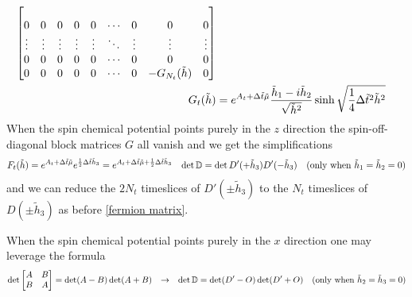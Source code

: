 \begin{align}
\begin{bmatrix}
\\	0               & 0         & 0                 & 0         & 0      & \cdots & 0       & 0                    & 0
\\	\vdots          & \vdots    & \vdots            & \vdots    & \vdots & \ddots & \vdots  & \vdots               & \vdots
\\	0               & 0         & 0                 & 0         & 0      & \cdots & 0       & 0                    & 0
\\	0               & 0         & 0                 & 0         & 0      & \cdots & 0       & -G_{N_t}(\tilde{h})  & 0
	\end{bmatrix}
    \\
	G_t(\tilde{h}) &= e^{A_t + \Delta\tilde{t}\tilde{\mu}} \frac{\tilde{h}_1 - i\tilde{h}_2}{\sqrt{\tilde{h}^2}} \sinh\sqrt{\frac{1}{4}\Delta\tilde{t}^2 \tilde{h}^2}
\end{align}
When the spin chemical potential points purely in the $z$ direction the spin-off-diagonal block matrices $G$ all vanish and we get the simplifications
\begin{align}
	F_t(\tilde{h}) &= e^{A_t + \Delta\tilde{t}\tilde{\mu}} e^{\frac{1}{2} \Delta\tilde{t} \tilde{h}_3} = e^{A_t + \Delta\tilde{t}\tilde{\mu} + \frac{1}{2} \Delta\tilde{t} \tilde{h}_3}
	&
	\det \mathbb{D} &= \det D'(+\tilde{h}_3) D'(-\tilde{h}_3)
	&
	(\text{only when }\tilde{h}_1=\tilde{h}_2=0)
\end{align}
and we can reduce the $2N_t$ timeslices of $D'(\pm\tilde{h}_3)$ to the $N_t$ timeslices of $D(\pm\tilde{h}_3)$ as before \eqref{fermion matrix}.

When the spin chemical potential points purely in the $x$ direction one may leverage the formula
\begin{align}
	\det \begin{bmatrix} A & B \\ B & A \end{bmatrix} &= \det(A-B) \det(A+B)
	&\rightarrow
	&&
	\det \mathbb{D} &= \det(D'-O) \det(D'+O)
	&
	(\text{only when }\tilde{h}_2=\tilde{h}_3=0)
\end{align}

